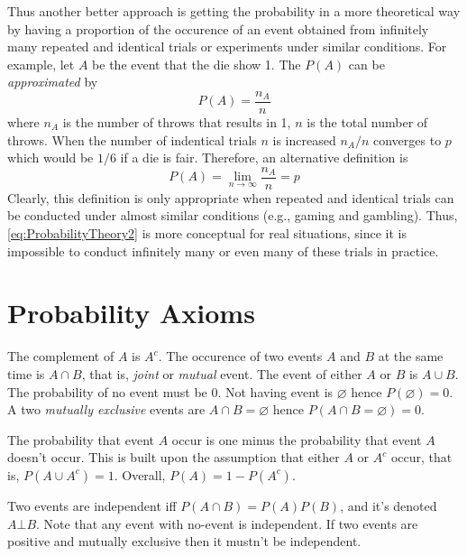 Thus another better approach is getting the probability in a more theoretical way by having a proportion of the occurence of an event obtained from infinitely many repeated and identical trials or experiments under similar conditions. For example,
let $A$ be the event that the die show 1. The $P(A)$ can be \emph{approximated} by 
\begin{equation}
    P(A)=\frac{n_A}{n}
\end{equation}
where $n_A$ is the number of throws that results in 1, $n$ is the total number of throws. When the number of indentical trials $n$ is increased $n_A/n$ converges to $p$ which would be $1/6$ if a die is fair. Therefore, an alternative definition 
is 
\begin{equation}\label{eq:ProbabilityTheory2}
    P(A)=\lim_{n\to\infty}\frac{n_A}{n}=p
\end{equation}
Clearly, this definition is only appropriate when repeated and identical trials can be conducted under almost similar conditions (e.g., gaming and gambling). Thus, \cref{eq:ProbabilityTheory2} is more conceptual for real situations, since it is 
impossible to conduct infinitely many or even many of these trials in practice.

\section{Probability Axioms}
\begin{definitionbox}
    The complement of $A$ is $A^c$. The occurence of two events $A$ and $B$ at the same time is $A\cap B$, that is, \emph{joint} or \emph{mutual} event. The event of either $A$ or $B$ is $A\cup B$. The probability of no event must be $0$. Not having
    event is $\varnothing$ hence $P(\varnothing)=0$. A two \emph{mutually exclusive} events are $A\cap B=\varnothing$ hence $P(A\cap B=\varnothing)=0$.

    The probability that event $A$ occur is one minus the probability that event $A$ doesn't occur. This is built upon the assumption that either $A$ or $A^c$ occur, that is, $P(A\cup A^c)=1$. Overall, $P(A)=1-P(A^c)$.

    Two events are independent iff $P(A\cap B)=P(A)P(B)$, and it's denoted $A\bot B$. Note that any event with no-event is independent. If two events are positive and mutually exclusive then it mustn't be independent.
\end{definitionbox}
